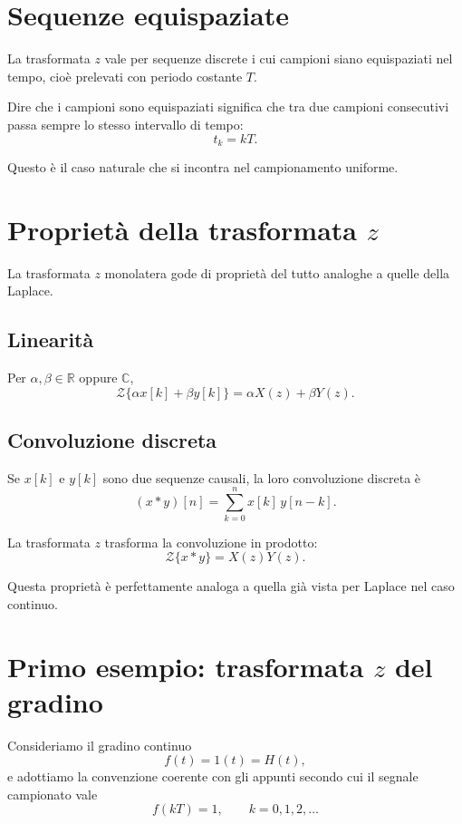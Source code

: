 \section{Sequenze equispaziate}

La trasformata \(z\) vale per sequenze discrete i cui campioni siano equispaziati nel tempo,
cioè prelevati con periodo costante \(T\).

Dire che i campioni sono equispaziati significa che tra due campioni consecutivi
passa sempre lo stesso intervallo di tempo:
\[
t_k = kT.
\]

Questo è il caso naturale che si incontra nel campionamento uniforme.

\section{Proprietà della trasformata \(z\)}

La trasformata \(z\) monolatera gode di proprietà del tutto analoghe a quelle della Laplace.

\subsection{Linearità}

Per \(\alpha,\beta\in\mathbb{R}\) oppure \(\mathbb{C}\),
\[
\mathcal{Z}\{\alpha x[k]+\beta y[k]\}
=
\alpha X(z)+\beta Y(z).
\]

\subsection{Convoluzione discreta}

Se \(x[k]\) e \(y[k]\) sono due sequenze causali, la loro convoluzione discreta è
\[
(x\ast y)[n]
=
\sum_{k=0}^{n} x[k]\,y[n-k].
\]

La trasformata \(z\) trasforma la convoluzione in prodotto:
\[
\mathcal{Z}\{x\ast y\}=X(z)Y(z).
\]

Questa proprietà è perfettamente analoga a quella già vista per Laplace nel caso continuo.

\section{Primo esempio: trasformata \(z\) del gradino}

Consideriamo il gradino continuo
\[
f(t)=1(t)=H(t),
\]
e adottiamo la convenzione coerente con gli appunti secondo cui il segnale campionato vale
\[
f(kT)=1,
\qquad k=0,1,2,\dots
\]

